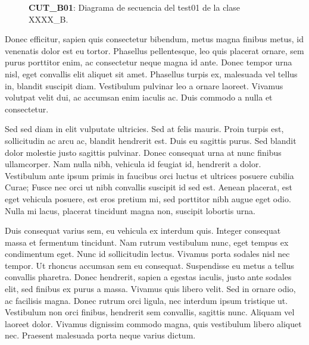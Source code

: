\documentclass[../informe.tex]{subfiles}
\begin{document}

\begin{figure}[H]
    \centering
    
    \caption{\label{dsCUTB01}\textbf{CUT\_B01}: Diagrama de secuencia del test01 de la clase XXXX\_B.}
\end{figure}

Donec efficitur, sapien quis consectetur bibendum, metus magna finibus metus, id venenatis dolor est eu tortor. Phasellus pellentesque, leo quis placerat ornare, sem purus porttitor enim, ac consectetur neque magna id ante. Donec tempor urna nisl, eget convallis elit aliquet sit amet. Phasellus turpis ex, malesuada vel tellus in, blandit suscipit diam. Vestibulum pulvinar leo a ornare laoreet. Vivamus volutpat velit dui, ac accumsan enim iaculis ac. Duis commodo a nulla et consectetur.

Sed sed diam in elit vulputate ultricies. Sed at felis mauris. Proin turpis est, sollicitudin ac arcu ac, blandit hendrerit est. Duis eu sagittis purus. Sed blandit dolor molestie justo sagittis pulvinar. Donec consequat urna at nunc finibus ullamcorper. Nam nulla nibh, vehicula id feugiat id, hendrerit a dolor. Vestibulum ante ipsum primis in faucibus orci luctus et ultrices posuere cubilia Curae; Fusce nec orci ut nibh convallis suscipit id sed est. Aenean placerat, est eget vehicula posuere, est eros pretium mi, sed porttitor nibh augue eget odio. Nulla mi lacus, placerat tincidunt magna non, suscipit lobortis urna.

Duis consequat varius sem, eu vehicula ex interdum quis. Integer consequat massa et fermentum tincidunt. Nam rutrum vestibulum nunc, eget tempus ex condimentum eget. Nunc id sollicitudin lectus. Vivamus porta sodales nisl nec tempor. Ut rhoncus accumsan sem eu consequat. Suspendisse eu metus a tellus convallis pharetra. Donec hendrerit, sapien a egestas iaculis, justo ante sodales elit, sed finibus ex purus a massa. Vivamus quis libero velit. Sed in ornare odio, ac facilisis magna. Donec rutrum orci ligula, nec interdum ipsum tristique ut. Vestibulum non orci finibus, hendrerit sem convallis, sagittis nunc. Aliquam vel laoreet dolor. Vivamus dignissim commodo magna, quis vestibulum libero aliquet nec. Praesent malesuada porta neque varius dictum.


\end{document}
